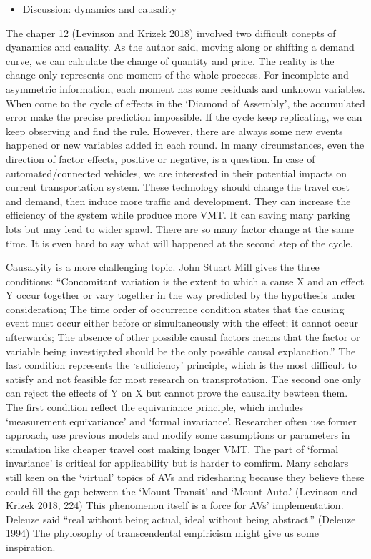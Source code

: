 \documentclass[12pt,]{article}
\providecommand{\tightlist}{%
  \setlength{\itemsep}{0pt}\setlength{\parskip}{0pt}}
\begin{document}
\begin{itemize}
\tightlist
\item
  Discussion: dynamics and causality
\end{itemize}

The chaper 12 (Levinson and Krizek 2018) involved two difficult conepts
of dyanamics and cauality. As the author said, moving along or shifting
a demand curve, we can calculate the change of quantity and price. The
reality is the change only represents one moment of the whole proccess.
For incomplete and asymmetric information, each moment has some
residuals and unknown variables. When come to the cycle of effects in
the `Diamond of Assembly', the accumulated error make the precise
prediction impossible. If the cycle keep replicating, we can keep
observing and find the rule. However, there are always some new events
happened or new variables added in each round. In many circumstances,
even the direction of factor effects, positive or negative, is a
question. In case of automated/connected vehicles, we are interested in
their potential impacts on current transportation system. These
technology should change the travel cost and demand, then induce more
traffic and development. They can increase the efficiency of the system
while produce more VMT. It can saving many parking lots but may lead to
wider spawl. There are so many factor change at the same time. It is
even hard to say what will happened at the second step of the cycle.

Causalyity is a more challenging topic. John Stuart Mill gives the three
conditions: ``Concomitant variation is the extent to which a cause X and
an effect Y occur together or vary together in the way predicted by the
hypothesis under consideration; The time order of occurrence condition
states that the causing event must occur either before or simultaneously
with the effect; it cannot occur afterwards; The absence of other
possible causal factors means that the factor or variable being
investigated should be the only possible causal explanation.'' The last
condition represents the `sufficiency' principle, which is the most
difficult to satisfy and not feasible for most research on
transprotation. The second one only can reject the effects of Y on X but
cannot prove the causality bewteen them. The first condition reflect the
equivariance principle, which includes `measurement equivariance' and
`formal invariance'. Researcher often use former approach, use previous
models and modify some assumptions or parameters in simulation like
cheaper travel cost making longer VMT. The part of `formal invariance'
is critical for applicability but is harder to comfirm. Many scholars
still keen on the `virtual' topics of AVs and ridesharing because they
believe these could fill the gap between the `Mount Transit' and `Mount
Auto.' (Levinson and Krizek 2018, 224) This phenomenon itself is a force
for AVs' implementation. Deleuze said ``real without being actual, ideal
without being abstract.'' (Deleuze 1994) The phylosophy of
transcendental empiricism might give us some inspiration.
\end{document}
